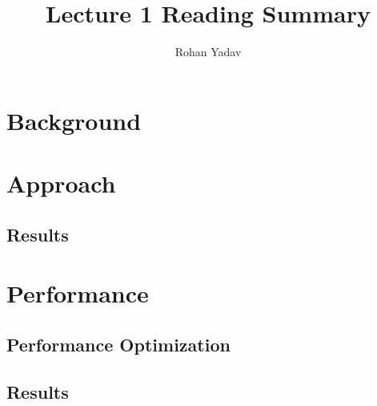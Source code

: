 \documentclass{article}
\author{Rohan Yadav}
\title{Lecture 1 Reading Summary}
\date{}
\begin{document}
\maketitle

\section{Background}

\section{Approach}

\subsection{Results}

\section{Performance}

\subsection{Performance Optimization}

\subsection{Results}
\end{document}
